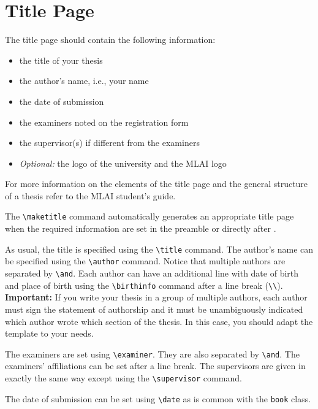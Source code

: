 \section{Title Page} \label{sec:title-page} 

The title page should contain the following information: 
\begin{itemize} 
	\item the title of your thesis
	\item the author's name, i.e., your name
	\item the date of submission 
	\item the examiners noted on the registration form
	\item the supervisor(s) if different from the examiners 
	\item \emph{Optional:} the logo of the university and the MLAI logo 
\end{itemize}
For more information on the elements of the title page and the general structure of a thesis refer to the MLAI student's guide. %

The \verb|\maketitle| command automatically generates an appropriate title page when the required information are set in the preamble or directly after \verb||. 

As usual, the title is specified using the \verb|\title| command. The author's name can be specified using the \verb|\author| command. Notice that multiple authors are separated by \verb|\and|. Each author can have an additional line with date of birth and place of birth using the \verb|\birthinfo| command after a line break (\verb|\\|). \textbf{Important:} If you write your thesis in a group of multiple authors, each author must sign the statement of authorship and it must be unambiguously indicated which author wrote which section of the thesis. In this case, you should adapt the template to your needs. 

The examiners are set using \verb|\examiner|. They are also separated by \verb|\and|. The examiners' affiliations can be set after a line break. The supervisors are given in exactly the same way except using the \verb|\supervisor| command. 

The date of submission can be set using \verb|\date| as is common with the \texttt{book} class. 